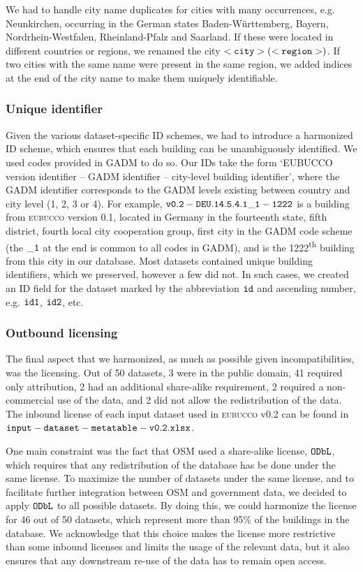 \documentclass[fleqn,10pt]{wlscirep}
\begin{document}
We had to handle city name duplicates for cities with many occurrences, e.g. Neunkirchen, occurring in the German states Baden-Württemberg, Bayern, Nordrhein-Westfalen, Rheinland-Pfalz and Saarland. If these were located in different countries or regions, we renamed the city $\tt{<city> (<region>)}$. If two cities with the same name were present in the same region, we added indices at the end of the city name to make them uniquely identifiable. 


\subsubsection*{Unique identifier}
Given the various dataset-specific ID schemes, we had to introduce a harmonized ID scheme, which ensures that each building can be unambiguously identified. We used codes provided in GADM to do so.  Our IDs take the form `EUBUCCO version identifier -- GADM identifier -- city-level building identifier', where the GADM identifier corresponds to the GADM levels existing between country and city level (1, 2, 3 or 4). For example, ${\tt v0.2-DEU.14.5.4.1\_1-1222}$ is a building from \textsc{eubucco} version 0.1, located in Germany in the fourteenth state, fifth district, fourth local city cooperation group, first city in the GADM code scheme (the ${\tt \_1}$ at the end is common to all codes in GADM), and is the 1222\textsuperscript{th} building from this city in our database. Most datasets contained unique building identifiers, which we preserved, however a few did not. In such cases, we created an ID field for the dataset marked by the abbreviation $\tt{id}$ and ascending number, e.g. $\tt{id1}$, $\tt{id2}$, etc.

\subsubsection*{Outbound licensing}

The final aspect that we harmonized, as much as possible given incompatibilities, was the licensing. Out of 50 datasets, 3 were in the public domain, 41 required only attribution, 2 had an additional share-alike requirement, 2 required a non-commercial use of the data, and 2 did not allow the redistribution of the data. The inbound license of each input dataset used in \textsc{eubucco} v0.2 can be found in ${\tt input-dataset-metatable-v0.2.xlsx}$.

One main constraint was the fact that OSM used a share-alike license, ${\tt ODbL}$, which requires that any redistribution of the database has be done under the same license. To maximize the number of datasets under the same license, and to facilitate further integration between OSM and government data, we decided to apply ${\tt ODbL}$ to all possible datasets. By doing this, we could harmonize the license for 46 out of 50 datasets, which represent more than 95\% of the buildings in the database. We acknowledge that this choice makes the license more restrictive than some inbound licenses and limits the usage of the relevant data, but it also ensures that any downstream re-use of the data has to remain open access.
\end{document}
